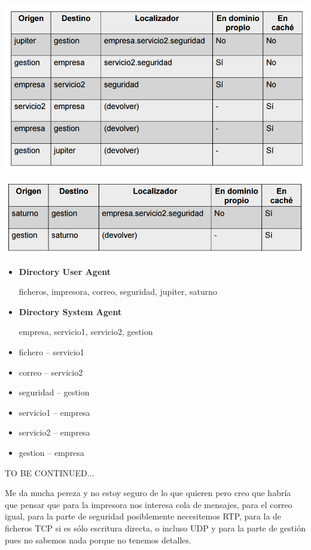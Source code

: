 \begin{problem}[20]
\spart
\begin{center}
\includegraphics[width=1\textwidth]{img/H2_E20_B.png}
\end{center}

\spart
\begin{center}
\includegraphics[width=1\textwidth]{img/H2_E20_C.png}
\end{center}

\spart
\begin{itemize}
\item \textbf{Directory User Agent}

ficheros, impresora, correo, seguridad, jupiter, saturno
\item \textbf{Directory System Agent}

empresa, servicio1, servicio2, gestion
\end{itemize}

\spart

\begin{itemize}
\item fichero – servicio1
\item correo – servicio2
\item seguridad – gestion
\end{itemize}

\spart
\begin{itemize}
\item servicio1 – empresa
\item servicio2 – empresa
\item gestion – empresa
\end{itemize}

\spart

\yoP

TO BE CONTINUED...

Me da mucha pereza y no estoy seguro de lo que quieren pero creo que habría que pensar que para la impresora nos interesa cola de mensajes, para el correo igual, para la parte de seguridad posiblemente necesitemos RTP, para la de ficheros TCP si es sólo escritura directa, o incluso UDP y para la parte de gestión pues no sabemos nada porque no tenemos detalles.
\end{problem}